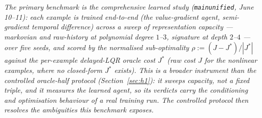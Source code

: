 \documentclass[11pt]{article}
\renewcommand{\_}{\discretionary{\textunderscore}{}{\textunderscore}}
\theoremstyle{plain}
\theoremstyle{definition}
\newcommand{\abs}[1]{\left\lvert #1 \right\rvert}
\begin{document}
\emph{The primary benchmark is the comprehensive learned study (\texttt{main\_unified}, June
10--11): each example is trained end-to-end (the value-gradient agent, semi-gradient temporal
difference) across a sweep of representation \emph{capacity} --- markovian and raw-history at
polynomial degree $1$--$3$, signature at depth $2$--$4$ --- over five seeds, and scored by the
normalised sub-optimality $\rho:=(J-J^{\ast})/\abs{J^{\ast}}$ against the per-example delayed-LQR
oracle cost $J^{\ast}$ (raw cost $J$ for the nonlinear examples, where no closed-form $J^{\ast}$
exists). This is a broader instrument than the controlled oracle-half protocol
(Section~\ref{sec:h1}): it sweeps capacity, not a fixed triple, and it measures the
\emph{learned} agent, so its verdicts carry the conditioning and optimisation behaviour of a
real training run. The controlled protocol then resolves the ambiguities this benchmark
exposes.}
\end{document}

